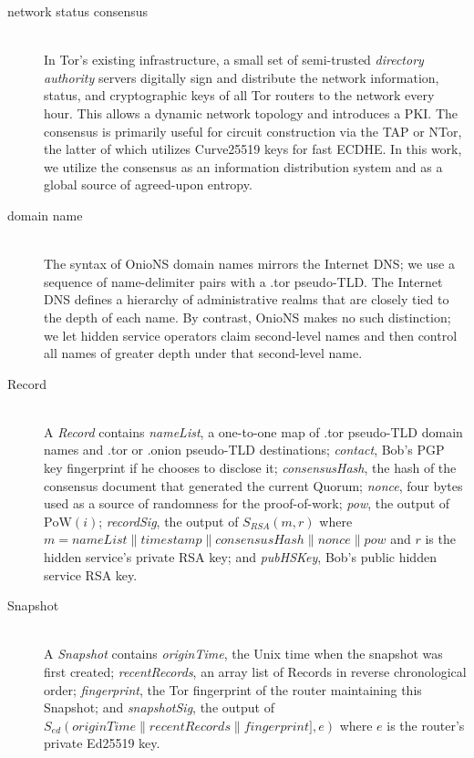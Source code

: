\documentclass{sig-alternate}
\newcommand*\concat{\mathbin{\|}}
\begin{document}
\begin{description}
	\item[network status consensus] \hfill \\
		In Tor's existing infrastructure, a small set of semi-trusted \textit{directory authority} servers digitally sign and distribute the network information, status, and cryptographic keys of all Tor routers to the network every hour. This allows a dynamic network topology and introduces a PKI. The consensus is primarily useful for circuit construction via the TAP\cite{goldberg2006security} or NTor\cite{goldberg2013anonymity}, the latter of which utilizes Curve25519\cite{bernstein2006curve25519} keys for fast ECDHE. In this work, we utilize the consensus as an information distribution system and as a global source of agreed-upon entropy.
		
	\item[domain name] \hfill \\
		The syntax of OnioNS domain names mirrors the Internet DNS; we use a sequence of name-delimiter pairs with a .tor pseudo-TLD. The Internet DNS defines a hierarchy of administrative realms that are closely tied to the depth of each name. By contrast, OnioNS makes no such distinction; we let hidden service operators claim second-level names and then control all names of greater depth under that second-level name.

	\item[Record] \hfill \\
		A \emph{Record} contains \emph{nameList}, a one-to-one map of .tor pseudo-TLD domain names and .tor or .onion pseudo-TLD destinations; \emph{contact}, Bob's PGP key fingerprint if he chooses to disclose it; \emph{consensusHash}, the hash of the consensus document that generated the current Quorum; \emph{nonce}, four bytes used as a source of randomness for the proof-of-work; \emph{pow}, the output of $ \mathrm{PoW}(i) $; \emph{recordSig}, the output of $ S_{\mathit{RSA}}(m, r) $ where $ m = \mathit{nameList} \concat \mathit{timestamp} \concat \mathit{consensusHash} \concat \mathit{nonce} \concat \mathit{pow} $ and $ r $ is the hidden service's private RSA key; and \emph{pubHSKey}, Bob's public hidden service RSA key.

	\item[Snapshot] \hfill \\
		A \emph{Snapshot} contains \emph{originTime}, the Unix time when the snapshot was first created; \emph{recentRecords}, an array list of Records in reverse chronological order; \emph{fingerprint}, the Tor fingerprint of the router maintaining this Snapshot; and  \emph{snapshotSig}, the output of $ S_{\mathit{ed}}(\mathit{originTime} \concat \mathit{recentRecords} \concat \mathit{fingerprint}], e) $ where $ e $ is the router's private Ed25519 key.


\end{description}
\end{document}
